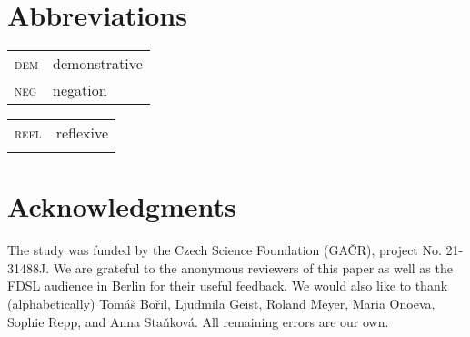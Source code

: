 \documentclass[output=paper,colorlinks,citecolor=brown]{langscibook}
\begin{document}



\section*{Abbreviations}

\begin{tabularx}{.5\textwidth}{@{}lQ}
\textsc{dem}&demonstrative\\
\textsc{neg}&negation\\
\end{tabularx}%
\begin{tabularx}{.5\textwidth}{lQ@{}}
\textsc{refl}&reflexive\\
&\\ %
\end{tabularx}

\section*{Acknowledgments}
The study was funded by the Czech Science Foundation (GAČR), project No. 21-31488J. We are grateful to the anonymous reviewers of this paper as well as the FDSL audience in Berlin for their useful feedback. We would also like to thank (alphabetically) Tomáš Bořil, Ljudmila Geist, Roland Meyer, Maria Onoeva, Sophie Repp, and Anna Staňková. All remaining errors are our own.

\printbibliography[heading=subbibliography,notkeyword=this]
\end{document}
